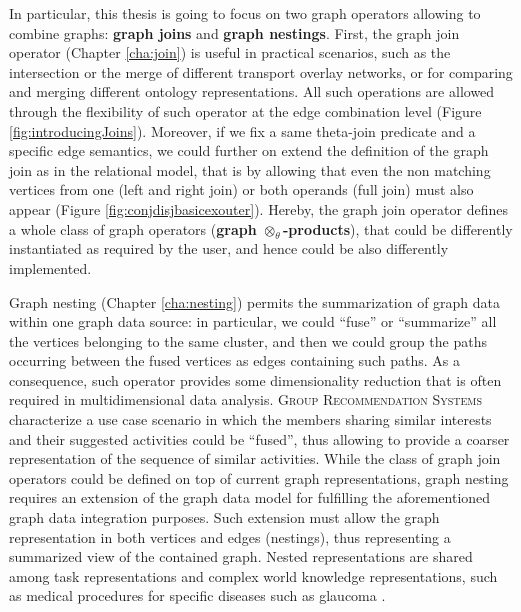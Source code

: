 In particular, this thesis is going to focus on two graph operators allowing to combine graphs: \textbf{graph joins} and \textbf{graph nestings}. First, the graph join operator (Chapter \vref{cha:join}) is useful in practical scenarios, such as the intersection or the merge of different transport overlay networks, or for comparing and merging different ontology representations. All such operations are allowed through the flexibility of such operator at the edge combination level (Figure \ref{fig:introducingJoins}). Moreover, if we fix a same theta-join predicate and a specific edge semantics, we could further on extend the definition of the graph join as in the relational model, that is by allowing that even the non matching vertices from one (left and right join) or both operands (full join) must also appear (Figure \ref{fig:conjdisjbasicexouter}). Hereby, the graph join operator defines a whole class of graph operators (\textbf{graph $\otimes_\theta$-products}), that could be differently instantiated as required by the user, and hence could be also differently implemented. 

Graph nesting (Chapter \vref{cha:nesting}) permits the summarization of graph data within one graph data source: in particular, we could ``fuse'' or ``summarize'' all the vertices belonging to the same cluster, and then we could group the paths occurring between the fused vertices as edges containing such paths. As a consequence, such operator provides some dimensionality reduction that is often required in multidimensional data analysis. \textsc{Group Recommendation Systems} characterize a use case scenario  in which the members sharing similar interests and their suggested activities could be ``fused'', thus allowing to provide a coarser representation of the sequence of similar activities.  While the class of graph join operators could be defined on top of current graph representations, graph nesting requires an extension of the graph data model for fulfilling the aforementioned graph data integration purposes. Such extension must allow the graph representation in both vertices and edges (nestings), thus representing a summarized view of the contained graph. Nested representations are shared among task representations and complex world knowledge representations, such as medical procedures for specific diseases such as glaucoma \cite{NestedGlaucoma}. 
\bigskip

